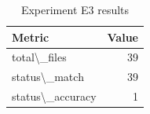 \begin{table}[htbp]
\centering
\footnotesize
\caption{Experiment E3 results}
\label{tab:e3-results}
\begin{tabular}{@{}lr@{}}
\toprule
\textbf{Metric} & \textbf{Value} \\
\midrule
total\textbackslash{}_files & 39 \\
status\textbackslash{}_match & 39 \\
status\textbackslash{}_accuracy & 1 \\
\bottomrule
\end{tabular}
\end{table}
